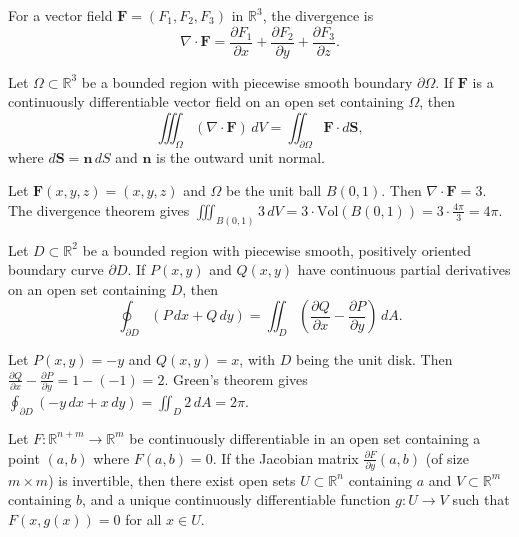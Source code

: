 \begin{definition}
For a vector field $\mathbf{F} = (F_1, F_2, F_3)$ in $\mathbb{R}^3$, the divergence is
\[
\nabla \cdot \mathbf{F} = \frac{\partial F_1}{\partial x} + \frac{\partial F_2}{\partial y} + \frac{\partial F_3}{\partial z}.
\]
\end{definition}

\begin{theorem}
Let $\Omega \subset \mathbb{R}^3$ be a bounded region with piecewise smooth boundary $\partial \Omega$. If $\mathbf{F}$ is a continuously differentiable vector field on an open set containing $\Omega$, then
\[
\iiint_\Omega (\nabla \cdot \mathbf{F}) \, dV = \iint_{\partial \Omega} \mathbf{F} \cdot d\mathbf{S},
\]
where $d\mathbf{S} = \mathbf{n} \, dS$ and $\mathbf{n}$ is the outward unit normal.
\end{theorem}

\begin{example}
Let $\mathbf{F}(x,y,z) = (x, y, z)$ and $\Omega$ be the unit ball $B(0,1)$. Then $\nabla \cdot \mathbf{F} = 3$. The divergence theorem gives $\iiint_{B(0,1)} 3 \, dV = 3 \cdot \mathrm{Vol}(B(0,1)) = 3 \cdot \frac{4\pi}{3} = 4\pi$.
\end{example}

\begin{theorem}
Let $D \subset \mathbb{R}^2$ be a bounded region with piecewise smooth, positively oriented boundary curve $\partial D$. If $P(x,y)$ and $Q(x,y)$ have continuous partial derivatives on an open set containing $D$, then
\[
\oint_{\partial D} (P \, dx + Q \, dy) = \iint_D \left(\frac{\partial Q}{\partial x} - \frac{\partial P}{\partial y}\right) \, dA.
\]
\end{theorem}

\begin{example}
Let $P(x,y) = -y$ and $Q(x,y) = x$, with $D$ being the unit disk. Then $\frac{\partial Q}{\partial x} - \frac{\partial P}{\partial y} = 1 - (-1) = 2$. Green's theorem gives $\oint_{\partial D} (-y \, dx + x \, dy) = \iint_D 2 \, dA = 2\pi$.
\end{example}

\begin{theorem}
Let $F: \mathbb{R}^{n+m} \to \mathbb{R}^m$ be continuously differentiable in an open set containing a point $(a,b)$ where $F(a,b) = 0$. If the Jacobian matrix $\frac{\partial F}{\partial y}(a,b)$ (of size $m \times m$) is invertible, then there exist open sets $U \subset \mathbb{R}^n$ containing $a$ and $V \subset \mathbb{R}^m$ containing $b$, and a unique continuously differentiable function $g: U \to V$ such that $F(x, g(x)) = 0$ for all $x \in U$.
\end{theorem}

